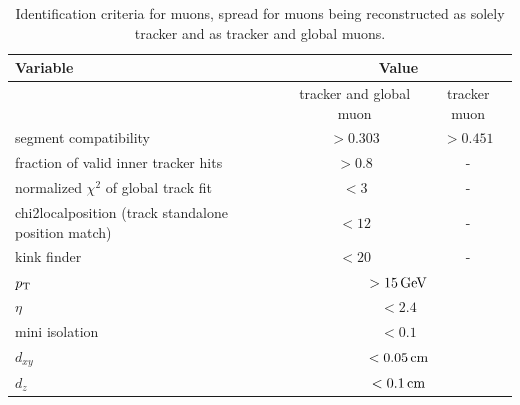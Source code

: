 \begin{table}[h!]
 \centering
 \caption{Identification criteria for muons, spread for muons being reconstructed as solely tracker and as tracker and global muons.}
 \label{tab:muonID}
 \begin{tabular}{lcc}
  Variable                                            & \multicolumn{2}{c}{Value}                     \\\hline
                                                      & tracker and global muon        & tracker muon \\\hline
  segment compatibility                               & $>0.303$                       & $>0.451$     \\
  fraction of valid inner tracker hits                & $>0.8$                         & -            \\
  normalized $\chi^2$ of global track fit             & $<3$                           & -            \\
  chi2localposition (track standalone position match) & $<12$                          & -            \\
  kink finder                                         & $<20$                          & -            \\\hline
  $p_{\mathrm{T}}$                                               & \multicolumn{2}{c}{$>15\,\text{Ge\hspace{-.08em}V}$}                 \\
  $\eta$                                              & \multicolumn{2}{c}{$<2.4$}                    \\
  mini isolation                                      & \multicolumn{2}{c}{$<0.1$}                    \\
  $d_{xy}$                                            & \multicolumn{2}{c}{$<0.05\,\text{cm}$}                \\
  $d_z$                                               & \multicolumn{2}{c}{$<0.1\,\text{cm}$}                 \\\hline
 \end{tabular}
\end{table}

